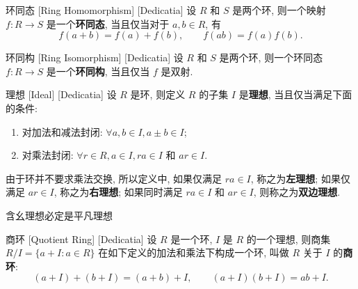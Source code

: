         \begin{dfn}
            {环同态}
            [Ring Homomorphism]
            [Dedicatia]
            设 \(R\) 和 \(S\) 是两个环, 则一个映射 \(f:R\to S\) 是一个\textbf{环同态}, 当且仅当对于 \(a,b\in R\), 有
            \[f(a+b)=f(a)+f(b),\qquad f(ab)=f(a)f(b).\]
        \end{dfn}

        \begin{dfn}
            {环同构}
            [Ring Isomorphism]
            [Dedicatia]
            设 \(R\) 和 \(S\) 是两个环, 则一个环同态 \(f:R\to S\) 是一个\textbf{环同构}, 当且仅当 \(f\) 是双射.
        \end{dfn}

        \begin{dfn}
            {理想}
            [Ideal]
            [Dedicatia]
            设 \(R\) 是环, 则定义 \(R\) 的子集 \(I\) 是\textbf{理想}, 当且仅当满足下面的条件:
            \begin{enumerate}
                \item 对加法和减法封闭: \(\forall a,b\in I, a\pm b\in I\);
                \item 对乘法封闭: \(\forall r\in R, a\in I, ra\in I\) 和 \(ar\in I\).
            \end{enumerate}
        \end{dfn}

        \begin{rmk}
            [Dedicatia]
            由于环并不要求乘法交换, 所以定义中, 如果仅满足 \(ra\in I\), 称之为\textbf{左理想}; 如果仅满足 \(ar\in I\), 称之为\textbf{右理想}; 如果同时满足 \(ra\in I\) 和 \(ar\in I\), 则称之为\textbf{双边理想}.
        \end{rmk}

        \begin{ppt}
            {含幺理想必定是平凡理想}
        \end{ppt}

        \begin{dfn}
            {商环}
            [Quotient Ring]
            [Dedicatia]
            设 \(R\) 是一个环, \(I\) 是 \(R\) 的一个理想, 则商集 \(R/I=\{a+I: a\in R\}\) 在如下定义的加法和乘法下构成一个环, 叫做 \(R\) 关于 \(I\) 的\textbf{商环}:
            \[(a+I)+(b+I)=(a+b)+I,\qquad (a+I)(b+I)=ab+I.\]
        \end{dfn}

